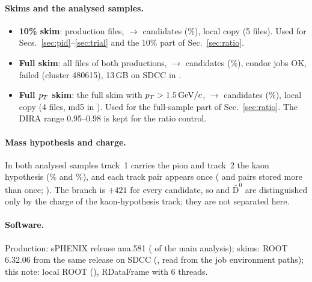 \paragraph{Skims and the analysed samples.}
\begin{itemize}
\item \textbf{10\% skim}: \tenFiles{} production files, \tenIn{} $\to$ \tenOut{} candidates (\tenFrac\%), local copy
   (5 files). Used for Secs.~\ref{sec:pid}--\ref{sec:trial} and the
  10\% part of Sec.~\ref{sec:ratio}.
\item \textbf{Full skim}: all \fullFiles{} \Dzero{} files of both productions, \fullIn{} $\to$ \fullOut{} candidates
  (\fullFrac\%), \fullJobsOK{} condor jobs OK, \fullJobsFailed{} failed (cluster 480615), 13\,GB on SDCC in
  .
\item \textbf{Full $p_T$ skim}: the full skim with \Dzero{} $p_T>1.5\,\mathrm{GeV}/c$, \tightIn{} $\to$ \tightOut{} candidates
  (\tightFrac\%), local copy  (4 files, md5 in
  ). Used for the full-sample part of Sec.~\ref{sec:ratio}. The DIRA range 0.95--0.98 is
  kept for the ratio control.
\end{itemize}

\paragraph{Mass hypothesis and charge.} In both analysed samples track~1 carries the pion and track~2 the kaon
hypothesis (\hypFracTen\% and \hypFracFull\%), and each track pair appears once (\multiTen{} and \multiFull{} pairs stored
more than once; ). The  branch is $+421$ for every candidate, so \Dzero{} and
$\bar{\mathrm{D}}^0$ are distinguished only by the charge of the kaon-hypothesis track; they are not separated here.



\paragraph{Software.} Production: sPHENIX release ana.581 ( of the main analysis); skims: ROOT
6.32.06 from the same release on SDCC (, read from the job environment paths); this note:
local ROOT \unskip{} (), RDataFrame with 6 threads.
